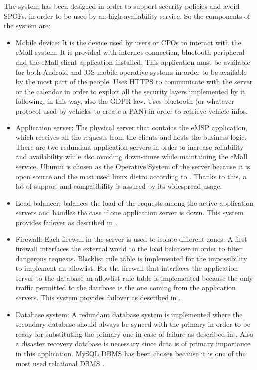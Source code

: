 The system has been designed in order to support security policies and avoid \acp{SPOF}, in order to be used by an high availability service. So the components of the system are:
\begin{itemize}
    \item Mobile device: It is the device used by users or \acp{CPO} to interact with the \ac{eMall} system. It is provided with internet connection, bluetooth peripheral and the \ac{eMall} client application installed. This application must be available for both Android and iOS mobile operative systems in order to be available by the most part of the people.
          Uses \ac{HTTPS} to communicate with the server or the calendar in order to exploit all the security layers implemented by it, following, in this way, also the \ac{GDPR} law. Uses bluetooth (or whatever protocol used by vehicles to create a \ac{PAN}) in order to retrieve vehicle infos.
    \item Application server: The physical server that contains the \ac{eMSP} application, which receives all the requests from the clients and hosts the business logic. There are two redundant application servers in order to increase reliability and availability while also avoiding down-times while maintaining the \ac{eMall} service.
          Ubuntu is chosen as the Operative System of the server because it is open source and the most used linux distro according to \cite{ref:most-popular-linux-distro}. Thanks to this, a lot of support and compatibility is assured by its widespread usage.
    \item Load balancer: balances the load of the requests among the active application servers and handles the case if one application server is down. This system provides failover as described in \cite{ref:redundant-load-balancers}.
    \item Firewall: Each firewall in the server is used to isolate different zones. A first firewall interfaces the external world to the load balancer in order to filter dangerous requests.
          Blacklist rule table is implemented for the impossibility to implement an allowlist. For the firewall that interfaces the application server to the database an allowlist rule table is implemented because the only traffic permitted to the database is the one coming from the application servers. This system provides failover as described in \cite{ref:redundant-firewalls}.
    \item Database system: A redundant database system is implemented where the secondary database should always be synced with the primary in order to be ready for substituting the primary one in case of failure as described in \cite{ref:redundant-databases}. Also a disaster recovery database is necessary since data is of primary importance in this application. MySQL DBMS has been chosen because it is one of the most used relational DBMS \cite{ref:most-popular-RDBMS}.
\end{itemize}

